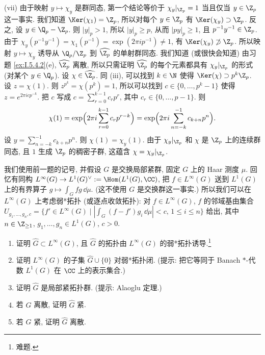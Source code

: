 \begin{solution}
(vii) 由于映射 $y \longmapsto \chi_y$ 是群同态, 第一个结论等价于 $\chi_y|_{\Z_p} = 1$ 当且仅当 $y \in \Z_p$ 这一事实. 我们知道 $\Ker(\chi_1) = \Z_p$, 所以对每个 $y \in \Z_p$ 有 $\Ker(\chi_y) \supset \Z_p$. 反之, 设 $y \in \Q_p - \Z_p$. 则 $|y|_p > 1$, 所以 $|y|_p \geq p$, 从而 $|py|_p \geq 1$, 且 $p^{-1}y^{-1} \in \Z_p$. 由于 $\chi_y(p^{-1}y^{-1}) = \chi_1(p^{-1}) = \exp(2\pi ip^{-1}) \neq 1$, 有 $\Ker(\chi_y) \not\supset \Z_p$.
所以映射 $y \longmapsto \chi_y$ 诱导从 $\Q_p/\Z_p$ 到 $\widehat{\Z_p}$ 的单射群同态. 我们知道 (或很快会知道) 由习题 \ref{ex:I.5.4.2}(e), $\widehat{\Z_p}$ 离散, 所以只需证明 $\widehat{\Z_p}$ 的每个元素都具有 $\chi_y|_{\Z_p}$ 的形式 (对某个 $y \in \Q_p$).
设 $\chi \in \widehat{\Z_p}$. 同 (iii), 可以找到 $k \in \N$ 使得 $\Ker(\chi) \supset p^k\Z_p$. 设 $z = \chi(1)$. 则 $z^{p^k} = \chi(p^k) = 1$, 所以可以找到 $c \in \{0, \ldots, p^k - 1\}$ 使得 $z = e^{2\pi icp^{-k}}$. 把 $c$ 写成 $c = \sum_{r=0}^{k-1}c_rp^r$, 其中 $c_r \in \{0, \ldots, p-1\}$. 则
\[
\chi(1) = \exp\Bigl(2\pi i\sum_{r=0}^{k-1}c_rp^{r-k}\Bigr) = \exp\Bigl(2\pi i\sum_{n=-k}^{-1}c_{k+n}p^n\Bigr).
\]
设 $y = \sum_{n=-k}^{-1}c_{k+n}p^n$. 则 $\chi(1) = \chi_y(1)$. 由于 $\chi_y|_{\Z_p}$ 和 $\chi$ 是 $\Z_p$ 上的连续群同态, 且 $1$ 生成 $\Z_p$ 的稠密子群, 这蕴含 $\chi = \chi_y|_{\Z_p}$.
\end{solution}

\begin{exercise}[对偶群的局部紧性]
\label{ex:I.5.4.2}
我们使用前一题的记号, 并假设 $G$ 是交换局部紧群, 固定 $G$ 上的 Haar 测度 $\mu$.
回忆有同构 $L^{\infty}(G) \to L^1(G)^{\vee} := \Hom(L^1(G), \CC)$, 把 $f \in L^{\infty}(G)$ 送到 $L^1(G)$ 上的有界算子 $g \longmapsto \int_G fg\,\dd\mu$. (这不使用 $G$ 是交换群这一事实.) 所以我们可以在 $L^{\infty}(G)$ 上考虑弱*拓扑 (或逐点收敛拓扑): 对 $f \in L^{\infty}(G)$, $f$ 的邻域基由集合 $U_{g_1,\ldots,g_n,c} = \{f' \in L^{\infty}(G) \mid |\int_G (f - f')g_i\,\dd\mu| < c,\, 1 \leq i \leq n\}$ 给出, 其中 $n \in \Z_{\geq 1}$, $g_1, \ldots, g_n \in L^1(G)$, $c > 0$.
\begin{enumerate}
\item[(a)] 证明 $\widehat{G} \subset L^{\infty}(G)$, 且 $\widehat{G}$ 的拓扑由 $L^{\infty}(G)$ 的弱*拓扑诱导.\footnote{难题.}
\item[(b)] 证明 $L^{\infty}(G)$ 的子集 $\widehat{G} \cup \{0\}$ 对弱*拓扑闭. (提示: 把它等同于 Banach $*$-代数 $L^1(G)$ 在 $\CC$ 上的表示集合.)
\item[(c)] 证明 $\widehat{G}$ 是局部紧拓扑群. (提示: Alaoglu 定理.)
\item[(d)] 若 $G$ 离散, 证明 $\widehat{G}$ 紧.
\item[(e)] 若 $G$ 紧, 证明 $\widehat{G}$ 离散.
\end{enumerate}
\end{exercise}

